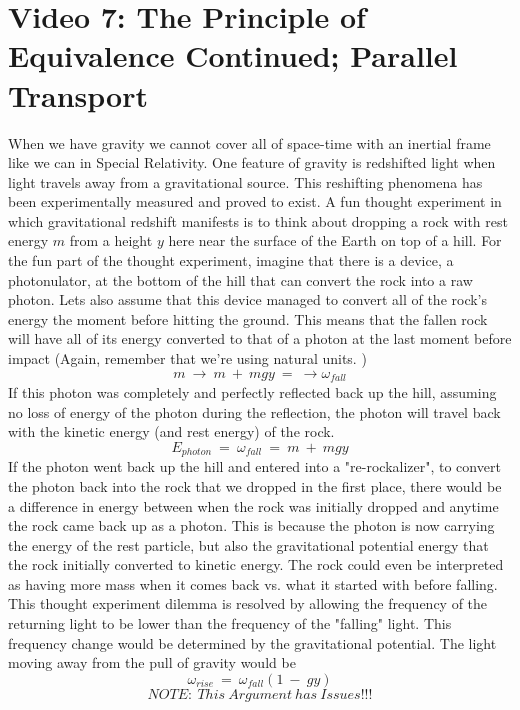 \section*{Video 7: The Principle of Equivalence Continued; Parallel Transport}
\hskip 25pt When we have gravity we cannot cover all of space-time with an inertial frame like we can in
Special Relativity.  One feature of gravity is redshifted light when light travels away from a gravitational source.
This reshifting phenomena has been experimentally measured and proved to exist.  A fun thought experiment in which
gravitational redshift manifests is to think about dropping a rock with rest energy $m$ from a height $y$ here near
the surface of the Earth on top of a hill.  For the fun part of the thought experiment, imagine that there is a device,
a photonulator, at the bottom of the hill that can convert the rock into a raw photon.  Lets also assume that this device
managed to convert all of the rock's energy the moment before hitting the ground.  This means that the fallen rock will
have all of its energy converted to that of a photon at the last moment before impact
(Again, remember that we're using natural units.  )
\begin{equation}
  m\ \rightarrow\ m\ +\ mgy\ =\ \rightarrow \omega_{\mathit{fall}}
\end{equation}
If this photon was completely and perfectly reflected back up the hill, assuming no loss of energy of the photon during the
reflection, the photon will travel back with the kinetic energy (and rest energy) of the rock.
\begin{equation}
  E_{\mathit{photon}}\ =\ \omega_{\mathit{fall}}\ =\ m\ +\ mgy
\end{equation}
If the photon went back up the hill and entered into a "re-rockalizer", to convert the photon back into the rock that we
dropped in the first place, there would be a difference in energy between when the rock was initially dropped and anytime the
rock came back up as a photon.  This is because the photon is now carrying the energy of the rest particle, but also the
gravitational potential energy that the rock initially converted to kinetic energy.  The rock could even be interpreted as
having more mass when it comes back vs. what it started with before falling.  This thought experiment dilemma is resolved by
allowing the frequency of the returning light to be lower than the frequency of the "falling" light.  This frequency change
would be determined by the gravitational potential.  The light moving away from the pull of gravity would be
\begin{equation}
  \omega_{\mathit{rise}}\ =\ \omega_{\mathit{fall}}\left (1\ -\ gy\right )
\end{equation}
$$ \mathit{NOTE:}\ This\ Argument\ has\ Issues!!! $$

